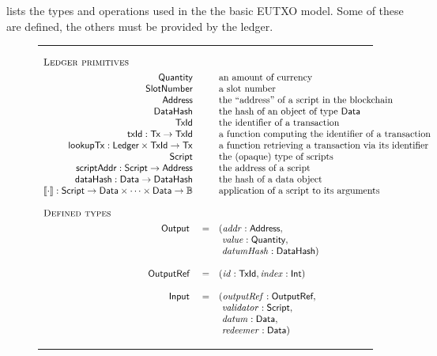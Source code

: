 \documentclass[a4paper]{article}
\newcommand{\s}{\textsf}  %
\newcommand{\msf}[1]{\ensuremath{\mathsf{#1}}}
\newcommand{\mi}[1]{\ensuremath{\mathit{#1}}}
\newcommand\rfskip{7pt}
\newenvironment{ruledfigure}[1]{\begin{figure}[#1]\hrule\vspace{\rfskip}}{\vspace{\rfskip}\hrule\end{figure}}
\newcommand{\script}{\ensuremath{\s{Script}}}
\newcommand{\scriptAddr}{\msf{scriptAddr}}
\newcommand{\TxId}{\ensuremath{\s{TxId}}}
\newcommand{\txId}{\msf{txId}}
\newcommand{\txrefid}{\mi{id}}
\newcommand{\Address}{\ensuremath{\s{Address}}}
\newcommand{\DataHash}{\ensuremath{\s{DataHash}}}
\newcommand{\hashData}{\msf{dataHash}}
\newcommand{\idx}{\mi{index}}
\newcommand{\addr}{\mi{addr}}
\newcommand{\val}{\mi{value}}  %
\newcommand{\validator}{\mi{validator}}
\newcommand{\redeemer}{\mi{redeemer}}
\newcommand{\datum}{\mi{datum}}
\newcommand{\datumHash}{\mi{datumHash}}
\newcommand{\Data}{\ensuremath{\s{Data}}}
\newcommand{\outputref}{\mi{outputRef}}
\newcommand{\lookupTx}{\msf{lookupTx}}
\newcommand{\slotnum}{\ensuremath{\s{SlotNumber}}}
\newcommand{\eutxotx}{\msf{Tx}}
\newcommand{\qty}{\ensuremath{\s{Quantity}}}
\newcommand{\applyScript}[1]{\ensuremath{\llbracket#1\rrbracket}}
\newcommand\B{\ensuremath{\mathbb{B}}}
\begin{document}
 lists the types and operations used in the
the basic EUTXO model. Some of these are defined, the others must be provided by
the ledger.
\begin{ruledfigure}{H}
  \begin{displaymath}
  \begin{array}{rll}
    \multicolumn{3}{l}{\textsc{Ledger primitives}}\\[4pt]
    \qty{} && \mbox{an amount of currency}\\
    \slotnum && \mbox{a slot number}\\
    \Address && \mbox{the ``address'' of a script in the blockchain}\\
    \DataHash && \mbox{the hash of an object of type \Data{}}\\
    \TxId && \mbox{the identifier of a transaction}\\
    \txId : \eutxotx \rightarrow \TxId && \mbox{a function computing the identifier of a transaction}\\
    \lookupTx : \s{Ledger} \times \TxId \rightarrow \eutxotx && \mbox{a function retrieving a transaction via its identifier}\\
    \script && \mbox{the (opaque) type of scripts}\\
    \scriptAddr : \script \rightarrow \Address && \mbox{the address of a script}\\
    \hashData : \Data \rightarrow \DataHash && \mbox{the hash of a data object}\\
    \applyScript{\cdot}: \script \rightarrow \Data \times \cdots \times
    \Data \rightarrow \B && \mbox{application of a script to its arguments}\\
    \\
    \multicolumn{3}{l}{\textsc{Defined types}}\\[4pt]
    \s{Output } &=&(\addr: \Address,\\
                & &\ \val: \qty,\\
                & &\ \datumHash: \DataHash)\\
    \\
    \s{OutputRef } &=&(\txrefid: \TxId, \idx: \s{Int})\\
    \\
    \s{Input } &=&(\outputref: \s{OutputRef},\\
               & &\ \validator: \script,\\
               & &\ \datum: \Data,\\
               & &\ \redeemer: \Data)\\

\end{array}
\end{displaymath}
\end{ruledfigure}
\end{document}
